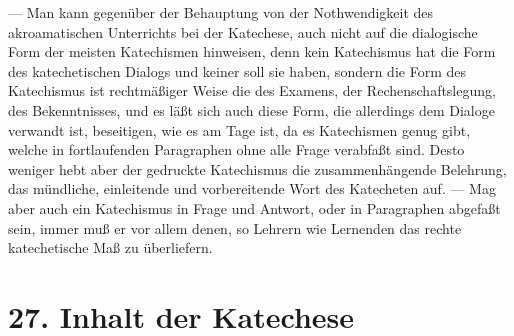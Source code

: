 — Man kann gegenüber der Behauptung von der Nothwendigkeit des akroamatischen Unterrichts bei der Katechese, auch nicht auf die dialogische Form der meisten Katechismen hinweisen, denn kein Katechismus hat die Form des katechetischen Dialogs und keiner soll sie haben, sondern die Form des Katechismus ist rechtmäßiger Weise die des Examens, der Rechenschaftslegung, des Bekenntnisses, und es läßt sich auch diese Form, die allerdings dem Dialoge verwandt ist, beseitigen, wie es am Tage ist, da es Katechismen genug gibt, welche in fortlaufenden Paragraphen ohne alle Frage verabfaßt sind. Desto weniger hebt aber der gedruckte Katechismus
die zusammenhängende Belehrung, das mündliche, einleitende und vorbereitende Wort des Katecheten auf. — Mag aber auch ein Katechismus in Frage und Antwort, oder in Paragraphen abgefaßt sein, immer muß er vor allem denen, so Lehrern wie Lernenden das rechte katechetische Maß zu überliefern.

\section{27. Inhalt der Katechese}

